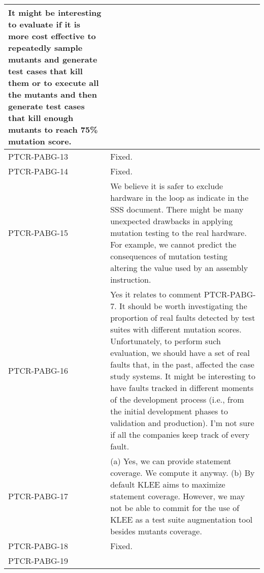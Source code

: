 \begin{longtable}{|p{1.5cm}|p{12cm}|@{}}
\begin{minipage}{12cm}
It might be interesting to evaluate if it is more cost effective to repeatedly sample mutants and generate test cases that kill them or to execute all the mutants and then generate test cases that kill enough mutants to reach 75\% mutation score.

\end{minipage}\\
\hline
PTCR-PABG-13&
\begin{minipage}{12cm}
Fixed.
\end{minipage}\\
\hline
PTCR-PABG-14&
\begin{minipage}{12cm}
Fixed.
\end{minipage}\\
\hline
PTCR-PABG-15&
\begin{minipage}{12cm}
We believe it is safer to exclude hardware in the loop as indicate in the SSS document. There might be many unexpected drawbacks in applying mutation testing to the real hardware. For example, we cannot predict the consequences of mutation testing altering the value used by an assembly instruction.
\end{minipage}\\
\hline
PTCR-PABG-16&
\begin{minipage}{12cm}
Yes it relates to comment PTCR-PABG-7. It should be worth investigating the proportion of real faults detected by test suites with different mutation scores. Unfortunately, to perform such evaluation, we should have a set of real faults that, in the past, affected the case study systems. It might be interesting to have faults tracked in different moments of the development process (i.e., from the initial development phases to validation and production). I'm not sure if all the companies keep track of every fault.
\end{minipage}\\
\hline
PTCR-PABG-17&
\begin{minipage}{12cm}
(a) Yes, we can provide statement coverage. We compute it anyway.
(b) By default KLEE aims to maximize statement coverage. However, we may not be able to commit for the use of KLEE as a test suite augmentation tool besides mutants coverage.
\end{minipage}\\
\hline
PTCR-PABG-18&
\begin{minipage}{12cm}
Fixed.
\end{minipage}\\
\hline
PTCR-PABG-19&
\begin{minipage}{12cm}

\end{minipage}
\end{longtable}
